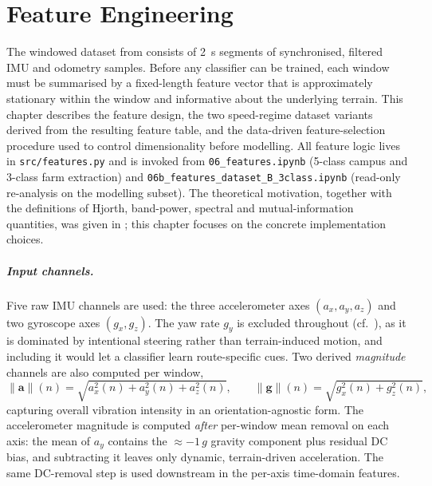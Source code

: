 \chapter{Feature Engineering}
\label{ch:feature}

The windowed dataset from  consists of \SI{2}{\second} segments of synchronised, filtered IMU and odometry samples. Before any classifier can be trained, each window must be summarised by a fixed-length feature vector that is approximately stationary within the window and informative about the underlying terrain. This chapter describes the feature design, the two speed-regime dataset variants derived from the resulting feature table, and the data-driven feature-selection procedure used to control dimensionality before modelling. All feature logic lives in \texttt{src/features.py} and is invoked from \texttt{06\_features.ipynb} (5-class campus and 3-class farm extraction) and \texttt{06b\_features\_dataset\_B\_3class.ipynb} (read-only re-analysis on the modelling subset). The theoretical motivation, together with the definitions of Hjorth, band-power, spectral and mutual-information quantities, was given in ; this chapter focuses on the concrete implementation choices.

\paragraph{Input channels.}
Five raw IMU channels are used: the three accelerometer axes $(a_x, a_y, a_z)$ and two gyroscope axes $(g_x, g_z)$. The yaw rate $g_y$ is excluded throughout (cf.\ ), as it is dominated by intentional steering rather than terrain-induced motion, and including it would let a classifier learn route-specific cues. Two derived \emph{magnitude} channels are also computed per window,
\begin{equation}
    \lVert \mathbf{a}\rVert(n) = \sqrt{a_x^2(n) + a_y^2(n) + a_z^2(n)},
    \qquad
    \lVert \mathbf{g}\rVert(n) = \sqrt{g_x^2(n) + g_z^2(n)},
    \label{eq:magnitudes}
\end{equation}
capturing overall vibration intensity in an orientation-agnostic form. The accelerometer magnitude is computed \emph{after} per-window mean removal on each axis: the mean of $a_y$ contains the $\approx{-1}\,g$ gravity component plus residual DC bias, and subtracting it leaves only dynamic, terrain-driven acceleration. The same DC-removal step is used downstream in the per-axis time-domain features.

